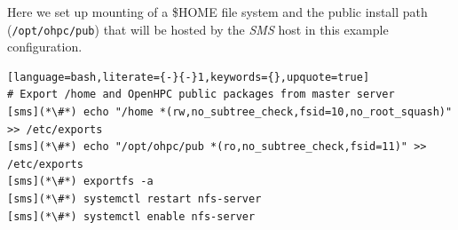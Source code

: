 Here we set up \NFS{}  mounting of a
\$HOME file system and the public \OHPC{} install path (\texttt{/opt/ohpc/pub})
that will be hosted by the {\em SMS} host in this  example configuration.

\begin{lstlisting}[language=bash,literate={-}{-}1,keywords={},upquote=true]
# Export /home and OpenHPC public packages from master server
[sms](*\#*) echo "/home *(rw,no_subtree_check,fsid=10,no_root_squash)" >> /etc/exports
[sms](*\#*) echo "/opt/ohpc/pub *(ro,no_subtree_check,fsid=11)" >> /etc/exports
[sms](*\#*) exportfs -a
[sms](*\#*) systemctl restart nfs-server
[sms](*\#*) systemctl enable nfs-server
\end{lstlisting}

